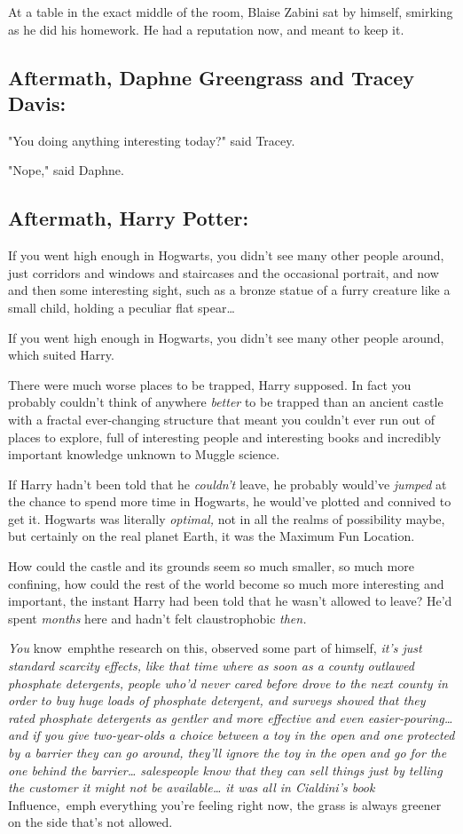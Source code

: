 At a table in the exact middle of the room, Blaise Zabini sat by himself, 
smirking as he did his homework. He had a reputation now, and meant to keep it.
\sbreak
\subsection{Aftermath, Daphne Greengrass and Tracey Davis:}

"You doing anything interesting today?" said Tracey.

"Nope," said Daphne.
\sbreak
\subsection{Aftermath, Harry Potter:}

If you went high enough in Hogwarts, you didn't see many other people around, 
just corridors and windows and staircases and the occasional portrait, and now 
and then some interesting sight, such as a bronze statue of a furry creature 
like a small child, holding a peculiar flat spear{\ldots}

If you went high enough in Hogwarts, you didn't see many other people around, 
which suited Harry.

There were much worse places to be trapped, Harry supposed. In fact you 
probably couldn't think of anywhere \emph{better} to be trapped than an ancient 
castle with a fractal ever-changing structure that meant you couldn't ever run 
out of places to explore, full of interesting people and interesting books and 
incredibly important knowledge unknown to Muggle science.

If Harry hadn't been told that he \emph{couldn't} leave, he probably would've 
\emph{jumped} at the chance to spend more time in Hogwarts, he would've plotted 
and connived to get it. Hogwarts was literally \emph{optimal,} not in all the 
realms of possibility maybe, but certainly on the real planet Earth, it was the 
Maximum Fun Location.

How could the castle and its grounds seem so much smaller, so much more 
confining, how could the rest of the world become so much more interesting and 
important, the instant Harry had been told that he wasn't allowed to leave? 
He'd spent \emph{months} here and hadn't felt claustrophobic \emph{then.}

\emph{You} know\ emph{the research on this,} observed some part of himself, 
\emph{it's just standard scarcity effects, like that time where as soon as a 
county outlawed phosphate detergents, people who'd never cared before drove to 
the next county in order to buy huge loads of phosphate detergent, and surveys 
showed that they rated phosphate detergents as gentler and more effective and 
even easier-pouring{\ldots} and if you give two-year-olds a choice between a 
toy in the open and one protected by a barrier they can go around, they'll 
ignore the toy in the open and go for the one behind the barrier{\ldots} 
salespeople know that they can sell things just by telling the customer it 
might not be available{\ldots} it was all in Cialdini's book} Influence,\ emph{
everything you're feeling right now, the grass is always greener on the side 
that's not allowed.}

